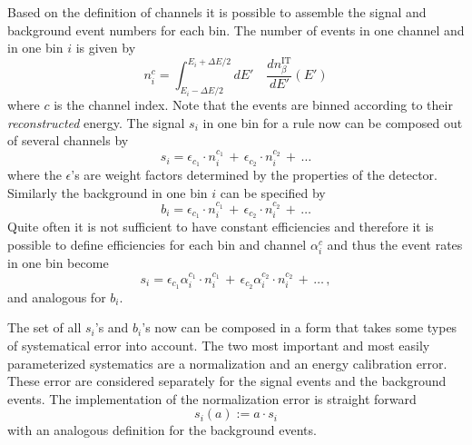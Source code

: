Based on the definition of channels it is possible to assemble the 
signal and background event numbers for each bin.  
The number of events in one channel and  in one bin $i$ is given by
\begin{equation}
n_i^c=\int_{E_i-\Delta E/2}^{E_i+\Delta E/2} dE' \quad
\frac{dn_{\beta}^{\text{IT}}}{dE'} (E')
\end{equation}
where $c$ is the channel index.
Note that the events are binned according to their \emph{reconstructed} energy.
The signal $s_i$ in one bin for a rule now can be composed out of 
several channels by
\begin{equation}
s_i=\epsilon_{c_1}\cdot n_i^{c_1}\,+\,\epsilon_{c_2}\cdot n_i^{c_2}\,+\,\ldots
\end{equation}
where the $\epsilon$'s are weight factors determined by the properties
of the detector.
Similarly the background in one bin $i$ can be specified by
\begin{equation}
b_i=\epsilon_{c_1}\cdot n_i^{c_1}\,+\,\epsilon_{c_2}\cdot n_i^{c_2}\,+\,\ldots
\end{equation}
Quite often it is not sufficient to have constant efficiencies and therefore
it is possible to define efficiencies for each bin and channel $\alpha_i^c$
and thus the event rates in one bin become
\begin{equation}
s_i=\epsilon_{c_1}\alpha_i^{c_1}\cdot n_i^{c_1}\,+
\,\epsilon_{c_2}\alpha_i^{c_2}\cdot n_i^{c_2}\,+\,\ldots\,,
\end{equation}
and analogous for $b_i$.



The set of all $s_i$'s and $b_i$'s now can be composed in a form that takes
some types of systematical error into account. The two most important and
most easily parameterized systematics are a normalization and an energy
calibration error. These error are considered separately for the signal events
and the background events. The implementation of the normalization error
is straight forward
\begin{equation}
s_i(a):=a\cdot s_i
\end{equation} 
with an analogous definition for the background events.

